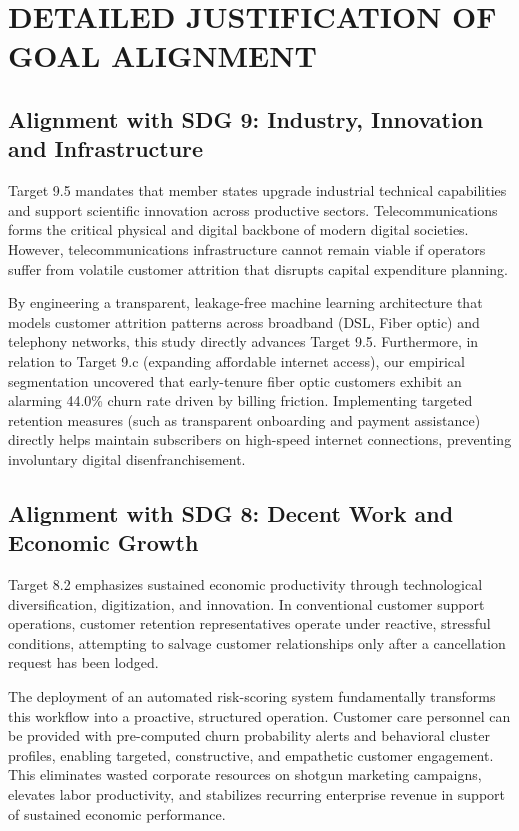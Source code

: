 \documentclass[12pt,a4paper]{report}
\begin{document}
\section{DETAILED JUSTIFICATION OF GOAL ALIGNMENT}

\subsection{Alignment with SDG 9: Industry, Innovation and Infrastructure}
Target 9.5 mandates that member states upgrade industrial technical capabilities and support scientific innovation across productive sectors. Telecommunications forms the critical physical and digital backbone of modern digital societies. However, telecommunications infrastructure cannot remain viable if operators suffer from volatile customer attrition that disrupts capital expenditure planning.

By engineering a transparent, leakage-free machine learning architecture that models customer attrition patterns across broadband (DSL, Fiber optic) and telephony networks, this study directly advances Target 9.5. Furthermore, in relation to Target 9.c (expanding affordable internet access), our empirical segmentation uncovered that early-tenure fiber optic customers exhibit an alarming 44.0\% churn rate driven by billing friction. Implementing targeted retention measures (such as transparent onboarding and payment assistance) directly helps maintain subscribers on high-speed internet connections, preventing involuntary digital disenfranchisement.

\subsection{Alignment with SDG 8: Decent Work and Economic Growth}
Target 8.2 emphasizes sustained economic productivity through technological diversification, digitization, and innovation. In conventional customer support operations, customer retention representatives operate under reactive, stressful conditions, attempting to salvage customer relationships only after a cancellation request has been lodged.

The deployment of an automated risk-scoring system fundamentally transforms this workflow into a proactive, structured operation. Customer care personnel can be provided with pre-computed churn probability alerts and behavioral cluster profiles, enabling targeted, constructive, and empathetic customer engagement. This eliminates wasted corporate resources on shotgun marketing campaigns, elevates labor productivity, and stabilizes recurring enterprise revenue in support of sustained economic performance.
\end{document}

